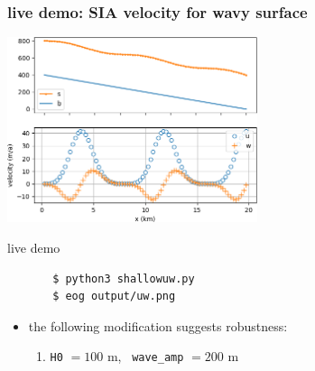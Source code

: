 \documentclass[10pt,dvipsnames]{beamer}
\begin{document}
\begin{frame}[fragile]
\frametitle{live demo: SIA velocity for wavy surface}

\begin{center}
\includegraphics[width=0.55\textwidth]{uw}
\end{center}

\begin{block}{live demo}
\begin{verbatim}
       $ python3 shallowuw.py
       $ eog output/uw.png
\end{verbatim}

\vspace{-2mm}
\begin{itemize}
\item the following modification suggests robustness:
    \begin{enumerate}
    \item \texttt{H0} $=100$ m, \, \texttt{wave\_amp} $=200$ m
    \end{enumerate}
\end{itemize}
\end{block}
\end{frame}
\end{document}
